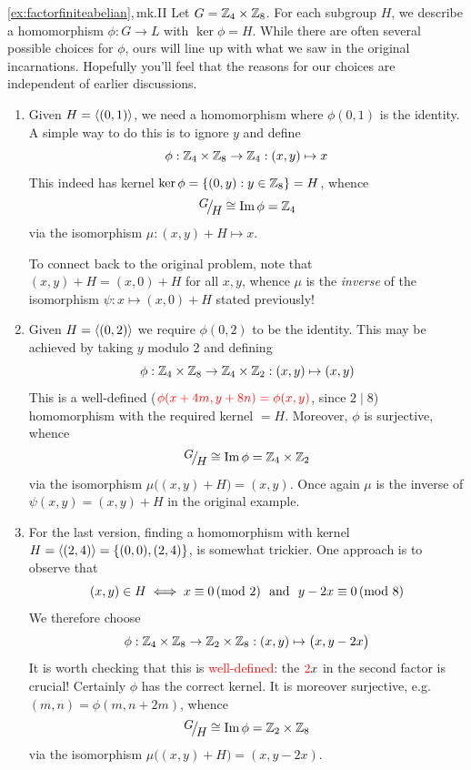 \begin{examples*}{\ref{ex:factorfiniteabelian},\,mk.II}{}
	Let $G=\mathbb{Z}_4\times\mathbb{Z}_8$. For each subgroup $H$, we describe a homomorphism $\phi:G\to L$ with $\ker\phi =H$. While there are often several possible choices for $\phi$, ours will line up with what we saw in the original incarnations. Hopefully you'll feel that the reasons for our choices are independent of earlier discussions. %
	\begin{enumerate}
	  \item Given $H=\left\langle (0,1)\right\rangle$, we need a homomorphism where $\phi(0,1)$ is the identity. A simple way to do this is to ignore $y$ and define
	  \[
	  	\phi:\mathbb{Z}_4\times\mathbb{Z}_8\to\mathbb{Z}_4:(x,y)\mapsto x
	  \]
	  This indeed has kernel $\ker\phi=\{(0,y):y\in\mathbb{Z}_8\} =H$, whence
	  \[
	  	\quotient GH\cong\image\phi=\Z_4
	  \]
	  via the isomorphism $\mu:(x,y)+H\mapsto x$.\par
	  To connect back to the original problem, note that $(x,y)+H=(x,0)+H$ for all $x,y$, whence $\mu$ is the \emph{inverse} of the isomorphism $\psi:x\mapsto (x,0)+H$ stated previously!
	
	  \item Given $H=\left\langle (0,2)\right\rangle$ we require $\phi(0,2)$ to be the identity. This may be achieved by taking $y$ modulo 2 and defining
	  \[
	  	\phi:\mathbb{Z}_4\times\mathbb{Z}_8\to\mathbb{Z}_4\times\mathbb{Z}_2:(x,y)\mapsto (x,y)
	  \]
	  This is a well-defined ($\textcolor{red}{\phi(x+4m,y+8n)=\phi(x,y)}$, since $2\mid 8$) homomorphism with the required kernel $=H$. Moreover, $\phi$ is surjective, whence
	  \[
	  	\quotient GH\cong \image\phi= \Z_4\times\Z_2
	  \]
	  via the isomorphism $\mu\bigl((x,y)+H\bigr) =(x,y)$. Once again $\mu$ is the inverse of $\psi(x,y)=(x,y)+H$ in the original example.
	  
	  \item For the last version, finding a homomorphism with kernel $H=\left\langle (2,4)\right\rangle=\{(0,0),(2,4)\}$, is somewhat trickier. One approach is to observe that
	  \[
	  	(x,y)\in H\iff x\equiv 0\negthickspace\pmod 2\ \text{ and }\ y-2x\equiv 0\negthickspace\pmod 8
	  \]
	  We therefore choose
	  \[
	 		\phi:\mathbb{Z}_4\times\mathbb{Z}_8\to\mathbb{Z}_2\times\mathbb{Z}_8:(x,y)\mapsto\bigl(x,y-2x\bigr)
	 	\]
	  It is worth checking that this is \textcolor{red}{well-defined}: the $\textcolor{red}{2}x$ in the second factor is crucial! Certainly $\phi$ has the correct kernel. It is moreover surjective, e.g.\ $(m,n)=\phi(m,n+2m)$, whence
	  \[
	  	\quotient GH\cong\image\phi=\Z_2\times\Z_8
	  \]
	  via the isomorphism $\mu\bigl((x,y)+H\bigr)=(x,y-2x)$.
	\end{enumerate}
\end{examples*}


